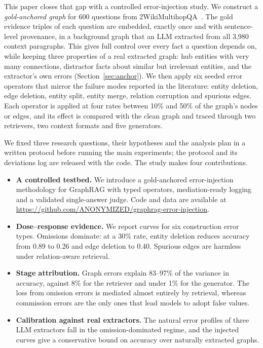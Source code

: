 \documentclass[11pt]{article}
\begin{document}
This paper closes that gap with a controlled error-injection study. We construct a \emph{gold-anchored graph} for 600 questions from 2WikiMultihopQA~\cite{ho2020twowiki}. The gold evidence triples of each question are embedded, exactly once and with sentence-level provenance, in a background graph that an LLM extracted from all 3,980 context paragraphs. This gives full control over every fact a question depends on, while keeping three properties of a real extracted graph: hub entities with very many connections, distractor facts about similar but irrelevant entities, and the extractor's own errors (Section~\ref{sec:anchor}). We then apply six seeded error operators that mirror the failure modes reported in the literature: entity deletion, edge deletion, entity split, entity merge, relation corruption and spurious edges. Each operator is applied at four rates between 10\% and 50\% of the graph's nodes or edges, and its effect is compared with the clean graph and traced through two retrievers, two context formats and five generators.

We fixed three research questions, their hypotheses and the analysis plan in a written protocol before running the main experiments; the protocol and its deviations log are released with the code. The study makes four contributions.

\begin{itemize}
\item \textbf{A controlled testbed.} We introduce a gold-anchored error-injection methodology for GraphRAG with typed operators, mediation-ready logging and a validated single-answer judge. Code and data are available at \url{https://github.com/ANONYMIZED/graphrag-error-injection}.
\item \textbf{Dose--response evidence.} We report curves for six construction error types. Omissions dominate: at a 30\% rate, entity deletion reduces accuracy from 0.89 to 0.26 and edge deletion to 0.40. Spurious edges are harmless under relation-aware retrieval.
\item \textbf{Stage attribution.} Graph errors explain 83--97\% of the variance in accuracy, against 8\% for the retriever and under 1\% for the generator. The loss from omission errors is mediated almost entirely by retrieval, whereas commission errors are the only ones that lead models to adopt false values.
\item \textbf{Calibration against real extractors.} The natural error profiles of three LLM extractors fall in the omission-dominated regime, and the injected curves give a conservative bound on accuracy over naturally extracted graphs.
\end{itemize}
\end{document}

